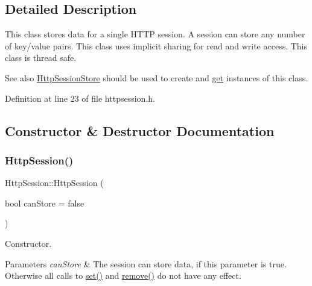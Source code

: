 \subsection{Detailed Description}
This class stores data for a single H\+T\+TP session. A session can store any number of key/value pairs. This class uses implicit sharing for read and write access. This class is thread safe. \begin{DoxySeeAlso}{See also}
\mbox{\hyperlink{classstefanfrings_1_1_http_session_store}{Http\+Session\+Store}} should be used to create and \mbox{\hyperlink{classstefanfrings_1_1_http_session_a6e5ae2c6d598511ca64acca9be0421be}{get}} instances of this class. 
\end{DoxySeeAlso}


Definition at line 23 of file httpsession.\+h.



\subsection{Constructor \& Destructor Documentation}
\mbox{\label{classstefanfrings_1_1_http_session_a9e29f7cbde568d40b2613c3cb3ac2eab}} 
\subsubsection{\texorpdfstring{Http\+Session()}{HttpSession()}\hspace{0.1cm}{\footnotesize\ttfamily [1/2]}}
{\footnotesize\ttfamily Http\+Session\+::\+Http\+Session (\begin{DoxyParamCaption}\item[{bool}]{can\+Store = {\ttfamily false} }\end{DoxyParamCaption})}

Constructor. 
\begin{DoxyParams}{Parameters}
{\em can\+Store} & The session can store data, if this parameter is true. Otherwise all calls to \mbox{\hyperlink{classstefanfrings_1_1_http_session_a777e082016803939b9ba5b7e4a7c9ab0}{set()}} and \mbox{\hyperlink{classstefanfrings_1_1_http_session_a57e5a59ce0106b0fa8cf9c4086d5a6b1}{remove()}} do not have any effect. \\
\hline
\end{DoxyParams}


